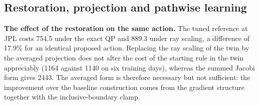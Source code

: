 \documentclass[11pt]{article}
\begin{document}
\subsection{Restoration, projection and pathwise learning}\label{sec:res-pgd}
\textbf{The effect of the restoration on the same action.} The tuned reference at JPL costs 754.5 under the exact QP and 889.3 under ray scaling, a difference of 17.9\% for an identical proposed action. Replacing the ray scaling of the twin by the averaged projection does not alter the cost of the starting rule in the twin appreciably (1164 against 1140 on six training days), whereas the summed Jacobi form gives 2443. The averaged form is therefore necessary but not sufficient: the improvement over the baseline construction comes from the gradient structure together with the inclusive-boundary clamp.
\end{document}
